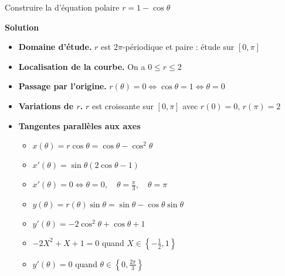 \begin{frame}
\begin{exemple}
Construire la  d'équation polaire $r=1-\cos\theta$

\pause
\medskip
\textbf{Solution}

\begin{itemize}
  \item \textbf{Domaine d'étude.} $r$ est $2\pi$-périodique et paire : étude sur $[0,\pi]$
\pause

    \item \textbf{Localisation de la courbe.} On a $0 \le r \le 2$
\pause

  \item \textbf{Passage par l'origine.} $r(\theta)=0 \iff \cos \theta  = 1 \iff \theta = 0$
\pause 
  \item \textbf{Variations de $r$.} $r$ est croissante sur $[0,\pi]$ avec $r(0)=0$, $r(\pi) = 2$  
\pause
  \item \textbf{Tangentes parallèles aux axes} 
  \begin{itemize}
    \pause\item $x(\theta) = r \cos \theta = \cos \theta - \cos^2\theta$
    \pause\item $x'(\theta) = \sin\theta ( 2\cos\theta -1)$
    \pause\item $x'(\theta) = 0 \iff \theta = 0, \quad \theta = \frac\pi3, \quad \theta = \pi$
  \end{itemize}
  \begin{itemize}   
    \pause\item $y(\theta) = r(\theta) \sin \theta = \sin \theta - \cos\theta \sin\theta$
    \pause\item $y'(\theta) = -2\cos^2\theta+\cos\theta+1$
    \pause\item $-2X^2+X+1=0$ quand $X\in \left\{-\frac12 , 1\right\}$
    \pause\item $y'(\theta) = 0$ quand $\theta\in\left\{ 0, \frac{2\pi}{3}\right\}$
  \end{itemize}
 \end{itemize}
 
\end{exemple}

\end{frame}



